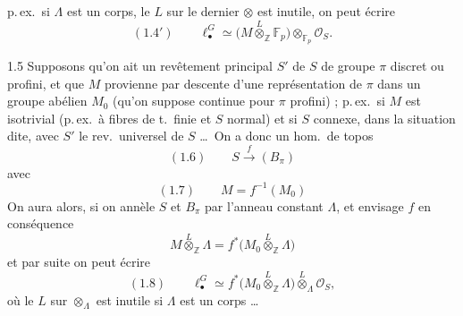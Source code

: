 \documentclass[11pt,a4paper]{article}
\begin{document}

p.\,ex.\ si $\Lambda$ est un corps, le $L$ sur le dernier $\otimes$ est
inutile, on peut écrire
\[
(1.4') \qquad \ell^{G}_\bullet \simeq \bigl(M \overset{L}{\otimes}_{\mathbb{Z}} \mathbb{F}_p\bigr) \otimes_{\mathbb{F}_p} \mathcal{O}_S .
\]

1.5 Supposons qu'on ait un
revêtement principal $S'$ de $S$ de groupe  $\pi$ discret
ou profini, et que $M$ provienne par descente d'une 
représentation de $\pi$ dans un groupe abélien $M_0$ (qu'on suppose
continue pour $\pi$ profini) ; p.\,ex.\ si $M$ est isotrivial (p.\,ex.\ à
fibres de t.\ finie et $S$  normal) et si $S$ connexe,
\ill{} \ill{} dans la situation dite, avec $S'$ le rev.\ universel de
$S$ \ldots\ On a donc un hom.\ de topos
\[
(1.6) \qquad S \xrightarrow{\ f\ } (B_\pi)
\]
avec
\[
(1.7) \qquad M = f^{-1}(M_0)
\]
On aura alors, si on annèle $S$ et $B_\pi$ par l'anneau constant $\Lambda$,
et envisage $f$ en conséquence
\[
M \overset{L}{\otimes}_{\mathbb{Z}} \Lambda = f^*\bigl(M_0 \overset{L}{\otimes}_{\mathbb{Z}} \Lambda\bigr)
\]
et par suite on peut écrire
\[
(1.8) \qquad \ell^{G}_\bullet \simeq f^*\bigl(M_0 \overset{L}{\otimes}_{\mathbb{Z}} \Lambda\bigr) \overset{L}{\otimes}_{\Lambda} \mathcal{O}_S ,
\]
où le $L$ sur $\otimes_\Lambda$ est inutile si $\Lambda$ est un
corps \ldots

\end{document}
